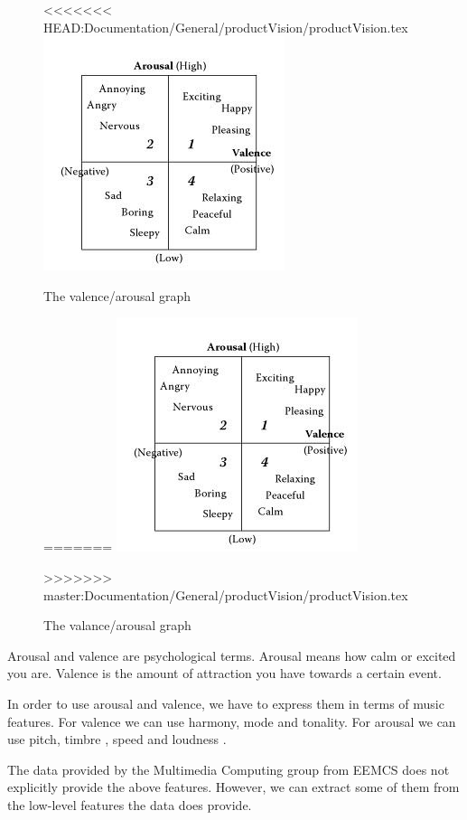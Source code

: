 \documentclass[10pt,a4paper]{article}
\begin{document}
\begin{figure}[h]
\center
<<<<<<< HEAD:Documentation/General/productVision/productVision.tex
\includegraphics[scale=0.75]{avgraph.jpg}
\caption{The valence/arousal graph \cite{Book}}
=======
\includegraphics[scale=0.75]{../avgraph.jpg}
\caption{The valance/arousal graph \cite{Book}}
>>>>>>> master:Documentation/General/productVision/productVision.tex
\endcenter
\label{fig:avgraph}

\end{figure}

Arousal and valence are psychological terms\cite{Thayer}.
Arousal means how calm or excited you are.
Valence is the amount of attraction you have towards a certain event.

In order to use arousal and valence, we have to express them in terms of music features.
For valence we can use harmony, mode and tonality\cite{DianaDeutsch}.
For arousal we can use pitch, timbre \cite{Liu03automaticmood}, speed and loudness \cite{PresentationMER}\cite{PaperME}.

\newpage

The data provided by the Multimedia Computing group from EEMCS does not explicitly provide the above features.
However, we can extract some of them from the low-level features the data does provide.
\end{document}
